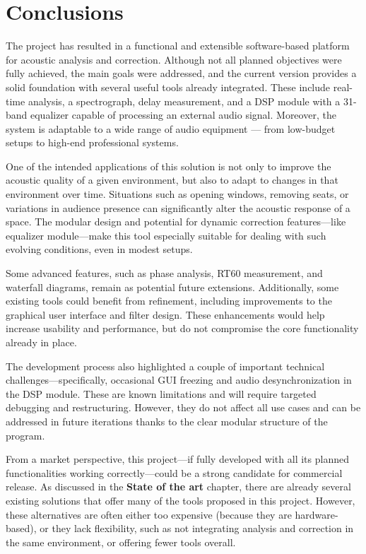 \chapter{Conclusions}

The project has resulted in a functional and extensible software-based platform for acoustic analysis and correction. Although not all planned objectives were fully achieved, the main goals were addressed, and the current version provides a solid foundation with several useful tools already integrated. These include real-time analysis, a spectrograph, delay measurement, and a DSP module with a 31-band equalizer capable of processing an external audio signal. Moreover, the system is adaptable to a wide range of audio equipment — from low-budget setups to high-end professional systems.

One of the intended applications of this solution is not only to improve the acoustic quality of a given environment, but also to adapt to changes in that environment over time. Situations such as opening windows, removing seats, or variations in audience presence can significantly alter the acoustic response of a space. The modular design and potential for dynamic correction features—like equalizer module—make this tool especially suitable for dealing with such evolving conditions, even in modest setups.

Some advanced features, such as phase analysis, RT60 measurement, and waterfall diagrams, remain as potential future extensions. Additionally, some existing tools could benefit from refinement, including improvements to the graphical user interface and filter design. These enhancements would help increase usability and performance, but do not compromise the core functionality already in place.

The development process also highlighted a couple of important technical challenges—specifically, occasional GUI freezing and audio desynchronization in the DSP module. These are known limitations and will require targeted debugging and restructuring. However, they do not affect all use cases and can be addressed in future iterations thanks to the clear modular structure of the program.

From a market perspective, this project—if fully developed with all its planned functionalities working correctly—could be a strong candidate for commercial release. As discussed in the \textbf{State of the art} chapter, there are already several existing solutions that offer many of the tools proposed in this project. However, these alternatives are often either too expensive (because they are hardware-based), or they lack flexibility, such as not integrating analysis and correction in the same environment, or offering fewer tools overall.

